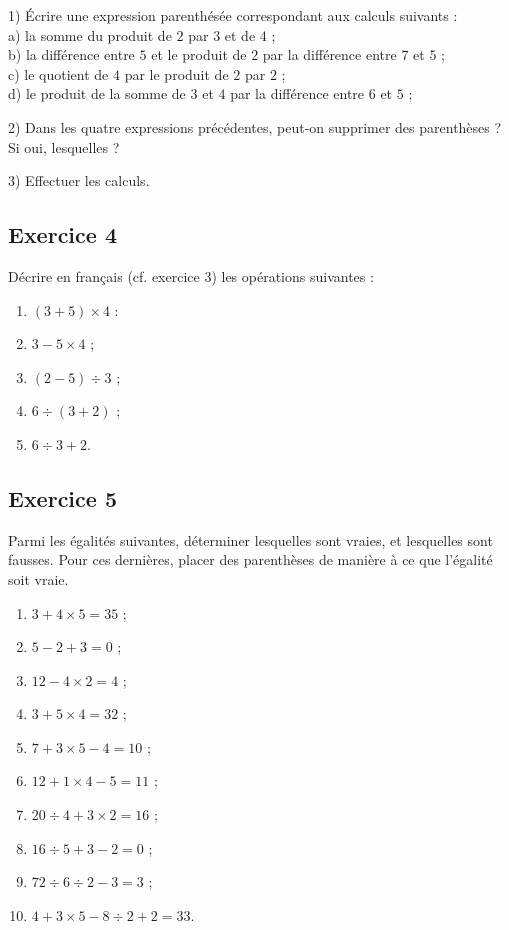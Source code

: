 \documentclass[12 pt]{extarticle}
\theoremstyle{plain}
\begin{document}
1) Écrire une expression parenthésée correspondant aux calculs suivants : \\
a) la somme du produit de $2$ par $3$ et de $4$ ;\\
b) la différence entre $5$ et le produit de $2$ par la différence entre $7$ et  $5$ ; \\
c) le quotient de $4$ par le produit de $2$ par $2$ ; \\
d) le produit de la somme de $3$ et $4$ par la différence entre $6$ et $5$ ;
 
2) Dans les quatre expressions précédentes, peut-on supprimer des parenthèses ? Si oui, lesquelles ? 

3) Effectuer les calculs.
 \newpage
\subsection*{Exercice 4}
Décrire en français (cf. exercice 3) les opérations suivantes : 
\begin{enumerate}
\item $(3 + 5)\times 4 $ :
\item $ 3 - 5 \times 4$ ; 
\item $  (2 - 5) \div 3 $ ;
\item $ 6\div (3+2)$ ;
\item $ 6\div 3+2$.
\end{enumerate}
\subsection*{Exercice 5}

Parmi les égalités suivantes, déterminer lesquelles sont vraies, et lesquelles sont fausses. Pour ces dernières, placer des parenthèses de manière à ce que l'égalité soit vraie. 
\begin{enumerate}
\item $ 3 + 4 \times 5 = 35$ ;
\item $ 5 - 2 + 3 = 0$ ;
\item $ 12 - 4 \times 2 = 4 $ ;
\item $ 3 + 5 \times 4 = 32$ ;
\item $ 7 + 3 \times 5 -4 = 10$ ;
\item $ 12 + 1\times 4 - 5 = 11$ ;
\item $ 20 \div 4 + 3 \times 2 = 16$ ; 
\item $ 16 \div 5 + 3 - 2 = 0$ ;
\item $ 72 \div 6 \div 2 - 3 = 3 $ ;
\item $ 4 + 3 \times 5 - 8 \div 2 + 2 = 33$.
\end{enumerate}
\end{document}
